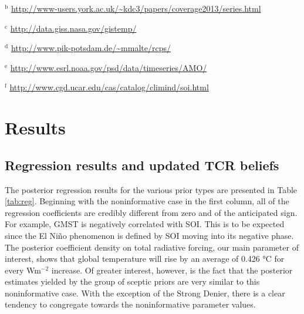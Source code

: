 \documentclass[smallextended]{svjour3}       %
\begin{document}
\begin{table}[t]
\begin{threeparttable}
\begin{tablenotes}
            \item $^\text{b}$ \url{http://www-users.york.ac.uk/~kdc3/papers/coverage2013/series.html} 
            \item $^\text{c}$ \url{http://data.giss.nasa.gov/gistemp/}
            \item $^\text{d}$ \url{http://www.pik-potsdam.de/~mmalte/rcps/} 
            \item $^\text{e}$ \url{http://www.esrl.noaa.gov/psd/data/timeseries/AMO/}
                \item $^\text{f}$ \url{http://www.cgd.ucar.edu/cas/catalog/climind/soi.html}        
            \end{tablenotes}
    \end{threeparttable} 
\end{table}

\hypertarget{sec:results}{%
\section{Results}\label{sec:results}}

\hypertarget{sec:regression}{%
\subsection{Regression results and updated TCR
beliefs}\label{sec:regression}}

The posterior regression results for the various prior types are
presented in Table \ref{tab:reg}. Beginning with the noninformative case
in the first column, all of the regression coefficients are credibly
different from zero and of the anticipated sign. For example, GMST is
negatively correlated with SOI. This is to be expected since the El Niño
phenomenon is defined by SOI moving into its negative phase. The
posterior coefficient density on total radiative forcing, our main
parameter of interest, shows that global temperature will rise by an
average of 0.426 °C for every Wm\(^{-2}\) increase. Of greater interest,
however, is the fact that the posterior estimates yielded by the group
of sceptic priors are very similar to this noninformative case. With the
exception of the Strong Denier, there is a clear tendency to congregate
towards the noninformative parameter values.
\end{document}
